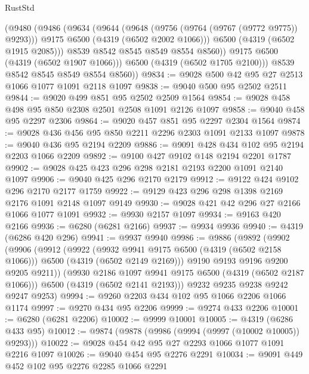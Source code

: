 \begin{lexlean}{RustStd}
\begin{coremodule}
            (@9480
              (@9486
                (@9634
                  (@9644
                    (@9648 (@9756 (@9764 (@9767 (@9772 @9775)) @9293)))
                    @9175
                    @6500
                    (@4319 (@6502 @2002 @1066)))
                  @6500
                  (@4319 (@6502 @1915 @2085)))
                @8539
                @8542
                @8545
                @8549
                @8554
                @8560))
            @9175
            @6500
            (@4319 (@6502 @1907 @1066)))
          @6500
          (@4319 (@6502 @1705 @2100)))
        @8539
        @8542
        @8545
        @8549
        @8554
        @8560))
@9834 := @9028 @500 @42 @95 @27 @2513 @1066 @1077 @1091 @2118 @1097
@9838 := @9040 @500 @95 @2502 @2511
@9844 := @9020 @499 @851 @95 @2502 @2509 @1564
@9854 := @9028 @458 @498 @95 @850 @2308 @2501 @2508 @1091 @2126 @1097
@9858 := @9040 @458 @95 @2297 @2306
@9864 := @9020 @457 @851 @95 @2297 @2304 @1564
@9874 := @9028 @436 @456 @95 @850 @2211 @2296 @2303 @1091 @2133 @1097
@9878 := @9040 @436 @95 @2194 @2209
@9886 := @9091 @428 @434 @102 @95 @2194 @2203 @1066 @2209
@9892 := @9100 @427 @9102 @148 @2194 @2201 @1787
@9902 := @9028 @425 @423 @296 @298 @2181 @2193 @2200 @1091 @2140 @1097
@9906 := @9040 @425 @296 @2170 @2179
@9912 := @9122 @424 @9102 @296 @2170 @2177 @1759
@9922 := @9129 @423 @296 @298 @1398 @2169 @2176 @1091 @2148 @1097 @9149
@9930 := @9028 @421 @42 @296 @27 @2166 @1066 @1077 @1091
@9932 := @9930 @2157 @1097
@9934 := @9163 @420 @2166
@9936 := @6280 (@6281 @2166)
@9937 := @9934 @9936
@9940 := @4319 (@6286 @420 @296)
@9941 := @9937 @9940
@9986 := @9886
    (@9892
      (@9902
        (@9906
          (@9912
            (@9922
              (@9932 @9941 @9175 @6500 (@4319 (@6502 @2158 @1066)))
              @6500
              (@4319 (@6502 @2149 @2169)))
            @9190
            @9193
            @9196
            @9200
            @9205
            @9211))
        (@9930 @2186 @1097 @9941 @9175 @6500 (@4319 (@6502 @2187 @1066)))
        @6500
        (@4319 (@6502 @2141 @2193)))
      @9232
      @9235
      @9238
      @9242
      @9247
      @9253)
@9994 := @9260 @2203 @434 @102 @95 @1066 @2206 @1066 @1174
@9997 := @9270 @434 @95 @2206
@9999 := @9274 @433 @2206
@10001 := @6280 (@6281 @2206)
@10002 := @9999 @10001
@10005 := @4319 (@6286 @433 @95)
@10012 := @9874 (@9878 (@9986 (@9994 (@9997 (@10002 @10005)) @9293)))
@10022 := @9028 @454 @42 @95 @27 @2293 @1066 @1077 @1091 @2216 @1097
@10026 := @9040 @454 @95 @2276 @2291
@10034 := @9091 @449 @452 @102 @95 @2276 @2285 @1066 @2291

\end{coremodule}
\end{lexlean}
